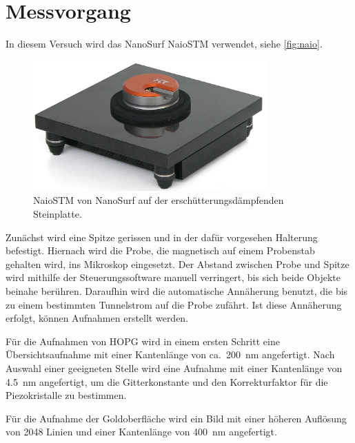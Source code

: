 \section{Messvorgang}

In diesem Versuch wird das NanoSurf NaioSTM verwendet, siehe \autoref{fig:naio}.
\begin{figure}
  \centering
  \includegraphics[width=0.8\textwidth]{./images/naiostm-zoom.jpg}
  \caption{%
    NaioSTM von NanoSurf auf der erschütterungsdämpfenden Steinplatte.~\cite{naio}
  }\label{fig:naio}
\end{figure}

Zunächst wird eine Spitze gerissen und in der dafür vorgesehen Halterung befestigt.
Hiernach wird die Probe, die magnetisch auf einem Probenstab gehalten wird, ins Mikroskop eingesetzt.
Der Abstand zwischen Probe und Spitze wird mithilfe der Steuerungssoftware manuell verringert, bis sich beide Objekte beinahe berühren.
Daraufhin wird die automatische Annäherung benutzt, die bis zu einem bestimmten Tunnelstrom auf die Probe zufährt.
Ist diese Annäherung erfolgt, können Aufnahmen erstellt werden.

Für die Aufnahmen von HOPG wird in einem ersten Schritt eine Übersichtsaufnahme mit einer Kantenlänge von ca.\ \SI{200}{\nano\meter} angefertigt.
Nach Auswahl einer geeigneten Stelle wird eine Aufnahme mit einer Kantenlänge von \SI{4.5}{\nano\meter} angefertigt, um die Gitterkonstante und den Korrekturfaktor für die Piezokristalle zu bestimmen.

Für die Aufnahme der Goldoberfläche wird ein Bild mit einer höheren Auflösung von \num{2048} Linien und einer Kantenlänge von \SI{400}{\nano\meter} angefertigt.
